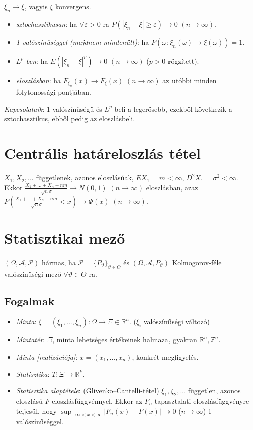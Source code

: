 \documentclass[margin=0px]{article}
\begin{document}
$\xi_n \to \xi$, vagyis $\xi$ konvergens.
\begin{itemize}
    \item \textit{sztochasztikusan}: ha $\forall \varepsilon > 0$-ra $P(|\xi_n - \xi| \geq \varepsilon) \rightarrow 0$ $(n \to \infty)$.
    \item \textit{1 valószínűséggel (majdnem mindenütt)}: ha $P(\omega : \xi_n(\omega) \to \xi(\omega)) = 1$.
    \item \textit{$L^p$-ben}: ha $E(|\xi_n - \xi|^p) \rightarrow 0$ $(n \to \infty)$ ($p>0$ rögzített).
    \item \textit{eloszlásban}: ha $F_{\xi_n}(x) \rightarrow F_{\xi}(x)$ $(n \to \infty)$ az utóbbi minden folytonossági pontjában.
\end{itemize}
\textit{Kapcsolataik}: 1 valószínűségű és $L^p$-beli a legerősebb, ezekből következik a sztochasztikus, ebből pedig az eloszlásbeli.

\section{Centrális határeloszlás tétel}

$X_1, X_2, ...$ függetlenek, azonos eloszlásúak, $EX_1 = m < \infty$, $D^{2}X_1 = \sigma^2 < \infty$. \\
Ekkor $\frac{X_1 + ... + X_n - nm}{\sqrt{n}\sigma} \rightarrow N(0,1)$ $(n \to \infty)$ eloszlásban, azaz $P(\frac{X_1 + ... + X_n - nm}{\sqrt{n}\sigma} < x) \rightarrow \Phi(x)$ $(n \to \infty)$.

\section{Statisztikai mező}

$(\Omega, \mathcal{A}, \mathcal{P})$ hármas, ha $\mathcal{P} = \{P_{\vartheta}\}_{\vartheta \in \Theta}$ és $(\Omega, \mathcal{A}, P_{\vartheta})$ Kolmogorov-féle valószínűségi mező $\forall \vartheta \in \Theta$-ra.

\subsection{Fogalmak}

\begin{itemize}
    \item \textit{Minta}: $\underline{\xi} = (\xi_1,...,\xi_n): \Omega \to \Xi \in \mathbb{R}^n$. ($\xi_i$ valószínűségi változó)
    \item \textit{Mintatér}: $\Xi$, minta lehetséges értékeinek halmaza, gyakran $\mathbb{R}^n, \mathbb{Z}^n$.
    \item \textit{Minta [realizációja]}: $\underline{x} = (x_1,...,x_n)$, konkrét megfigyelés.
    \item \textit{Statisztika}: $T: \Xi \to \mathbb{R}^k$.
    \item \textit{Statisztika alaptétele}: (Glivenko--Cantelli-tétel) $\xi_1, \xi_2, ...$ független, azonos eloszlású $F$ eloszlásfüggvénnyel. Ekkor az $F_n$ tapasztalati eloszlásfüggvényre teljesül, hogy $\sup_{-\infty<x<\infty}{|F_n(x) - F(x)|} \to 0$ ($n \to \infty$) 1 valószínűséggel.
\end{itemize}
\end{document}
